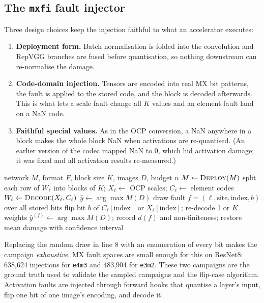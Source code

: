 \documentclass[12pt,a4paper]{article}
\newcommand{\fmt}[1]{\texttt{#1}}
\begin{document}
\subsection{The \texttt{mxfi} fault injector}
\label{sec:mxfi}

Three design choices keep the injection faithful to what an accelerator executes:
\begin{enumerate}
    \item \textbf{Deployment form.} Batch normalisation is folded into the convolution and
          RepVGG branches are fused before quantisation, so nothing downstream can
          re-normalise the damage.
    \item \textbf{Code-domain injection.} Tensors are encoded into real MX bit patterns, the
          fault is applied to the stored code, and the block is decoded afterwards. This is
          what lets a scale fault change all $K$ values and an element fault land on a NaN code.
    \item \textbf{Faithful special values.} As in the OCP conversion, a NaN anywhere in a block
          makes the whole block NaN when activations are re-quantised. (An earlier version of
          the codec mapped NaN to 0, which hid activation damage; it was fixed and all
          activation results re-measured.)
\end{enumerate}

\begin{algorithm}[H]
\caption{Weight fault-injection campaign}
\label{alg:campaign}
\begin{algorithmic}[1]
\small
\Require network $M$, format $F$, block size $K$, images $D$, budget $n$
\State $M\gets\textsc{Deploy}(M)$ 
  \State split each row of $W_\ell$ into blocks of $K$; $X_\ell\gets$ OCP scales; $C_\ell\gets$ element codes
  \State $W_\ell\gets\textsc{Decode}(X_\ell,C_\ell)$ 
\EndFor
\State $\hat y\gets\arg\max M(D)$ 
  \State draw fault $f=(\ell,\text{site},\text{index},b)$ over all stored bits
  \State flip bit $b$ of $C_\ell[\text{index}]$ or $X_\ell[\text{index}]$; re-decode 1 or $K$ weights
  \State $\hat y^{(f)}\gets\arg\max M(D)$; record $d(f)$ and non-finiteness; restore
\EndFor
\State \Return mean damage with confidence interval
\end{algorithmic}
\end{algorithm}

Replacing the random draw in line 8 with an enumeration of every bit makes the campaign
\emph{exhaustive}. MX fault spaces are small enough for this on ResNet8: 638,624 injections
for \fmt{e4m3} and 483,904 for \fmt{e3m2}. These two campaigns are the ground truth used to
validate the sampled campaigns and the flip-case algorithm. Activation faults are injected
through forward hooks that quantise a layer's input, flip one bit of one image's encoding, and
decode it.
\end{document}
